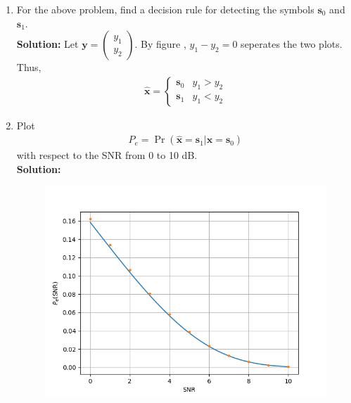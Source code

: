 \documentclass[journal,12pt,twocolumn]{IEEEtran}
\let\vec\mathbf
\numberwithin{equation}{section}
\renewcommand\thesection{\arabic{section}}
\providecommand{\pr}[1]{\ensuremath{\Pr\left(#1\right)}}
\newcommand{\myvec}[1]{\ensuremath{\begin{pmatrix}#1\end{pmatrix}}}
\providecommand{\gitlink}[2]{{\color{blue}\href{https://github.com/SterbenVD/AI1110-Assignments/blob/main/Assignment\%20-\%20Random\%20Numbers/#1}{#2}}}
\newcommand{\solution}{\noindent \textbf{\\ Solution: }}
\begin{document}
\begin{enumerate}[label=\thesection.\arabic*
        ,ref=\thesection.\theenumi]
\begin{figure}[H]
              \label{fig:8-1}
          \end{figure}
          The following \gitlink{codes/8-1.py}{python code} plots Fig. \ref{fig:8-1} or type in terminal:
          \begin{lstlisting}
wget https://github.com/SterbenVD/AI1110-Assignments/blob/main/Assignment\%20-\%20Random\%20Numbers/codes/8-1.py
                          \end{lstlisting}
    \item For the above problem, find a decision rule for detecting the symbols $\vec{s}_0$ and $\vec{s}_1$.
          \solution
          Let $\vec{y} = \myvec{y_1 \\ y_2}$. By figure , $y_1 - y_2 = 0$ seperates the two plots. \\
          Thus,
          \begin{align}
              \hat{\vec{x}} =
              \begin{cases}
                  \vec{s}_0 & y_1 > y_2 \\
                  \vec{s}_1 & y_1 < y_2
              \end{cases}
          \end{align}
    \item Plot
          \begin{align}
              P_e = \pr{\hat{\vec{x}} = \vec{s}_1 | \vec{x} = \vec{s}_0}
          \end{align}
          with respect to the SNR from 0 to 10 dB.
          \solution
          \begin{figure}[H]
              \centering
              \includegraphics[width = \columnwidth]{../figs/8-3.png}

\end{figure}
\end{enumerate}
\end{document}
